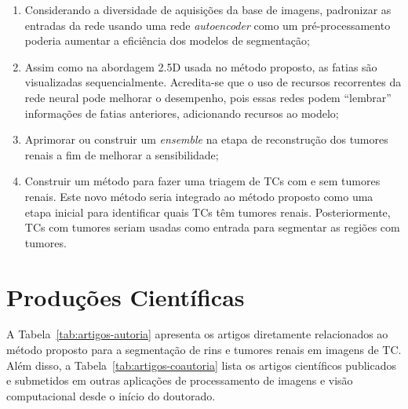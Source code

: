 \begin{enumerate}
    \item Considerando a diversidade de aquisições da base de imagens, padronizar as entradas da rede usando uma rede \textit{autoencoder} como um pré-processamento poderia aumentar a eficiência dos modelos de segmentação;
    
    \item Assim como na abordagem 2.5D usada no método proposto, as fatias são visualizadas sequencialmente. Acredita-se que o uso de recursos recorrentes da rede neural pode melhorar o desempenho, pois essas redes podem “lembrar” informações de fatias anteriores, adicionando recursos ao modelo;
    
    \item Aprimorar ou construir um \textit{ensemble} na etapa de reconstrução dos tumores renais a fim de melhorar a sensibilidade;
    
    \item Construir um método para fazer uma triagem de TCs com e sem tumores renais. Este novo método seria integrado ao método proposto como uma etapa inicial para identificar quais TCs têm tumores renais. Posteriormente, TCs com tumores seriam usadas como entrada para segmentar as regiões com tumores.
    
\end{enumerate}

\section{Produções Científicas}
\label{sec:producoes-cientificas}

A Tabela~\ref{tab:artigos-autoria} apresenta os artigos diretamente relacionados ao método proposto para a segmentação de rins e tumores renais em imagens de TC. Além disso, a Tabela~\ref{tab:artigos-coautoria} lista os artigos científicos publicados e submetidos em outras aplicações de processamento de imagens e visão computacional desde o início do doutorado.

